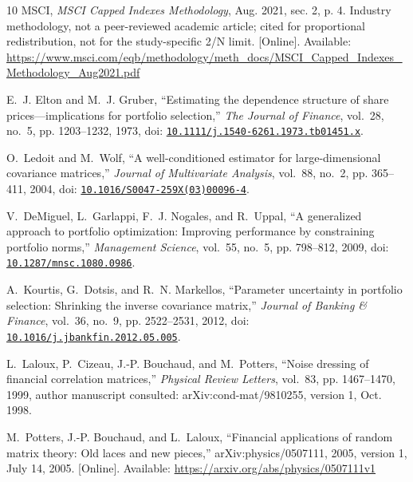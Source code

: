 \documentclass[letterpaper,journal]{IEEEtran}
\begin{document}
\begin{thebibliography}{10}
\BIBentryALTinterwordspacing
{MSCI}, \emph{{MSCI Capped Indexes Methodology}}, Aug. 2021, sec. 2, p. 4.
  Industry methodology, not a peer-reviewed academic article; cited for
  proportional redistribution, not for the study-specific 2/N limit. [Online].
  Available:
  \url{https://www.msci.com/eqb/methodology/meth_docs/MSCI_Capped_Indexes_Methodology_Aug2021.pdf}
\BIBentrySTDinterwordspacing

E.~J. Elton and M.~J. Gruber, ``Estimating the dependence structure of share
  prices---implications for portfolio selection,'' \emph{The Journal of
  Finance}, vol.~28, no.~5, pp. 1203--1232, 1973, doi:
  \href{https://doi.org/10.1111/j.1540-6261.1973.tb01451.x}{\nolinkurl{10.1111/j.1540-6261.1973.tb01451.x}}.

O.~Ledoit and M.~Wolf, ``A well-conditioned estimator for large-dimensional
  covariance matrices,'' \emph{Journal of Multivariate Analysis}, vol.~88,
  no.~2, pp. 365--411, 2004, doi:
  \href{https://doi.org/10.1016/S0047-259X(03)00096-4}{\nolinkurl{10.1016/S0047-259X(03)00096-4}}.

V.~DeMiguel, L.~Garlappi, F.~J. Nogales, and R.~Uppal, ``A generalized approach
  to portfolio optimization: Improving performance by constraining portfolio
  norms,'' \emph{Management Science}, vol.~55, no.~5, pp. 798--812, 2009, doi:
  \href{https://doi.org/10.1287/mnsc.1080.0986}{\nolinkurl{10.1287/mnsc.1080.0986}}.

A.~Kourtis, G.~Dotsis, and R.~N. Markellos, ``Parameter uncertainty in
  portfolio selection: Shrinking the inverse covariance matrix,'' \emph{Journal
  of Banking \& Finance}, vol.~36, no.~9, pp. 2522--2531, 2012, doi:
  \href{https://doi.org/10.1016/j.jbankfin.2012.05.005}{\nolinkurl{10.1016/j.jbankfin.2012.05.005}}.

L.~Laloux, P.~Cizeau, J.-P. Bouchaud, and M.~Potters, ``Noise dressing of
  financial correlation matrices,'' \emph{Physical Review Letters}, vol.~83,
  pp. 1467--1470, 1999, author manuscript consulted: arXiv:cond-mat/9810255,
  version 1, Oct. 1998.

\BIBentryALTinterwordspacing
M.~Potters, J.-P. Bouchaud, and L.~Laloux, ``Financial applications of random
  matrix theory: Old laces and new pieces,'' arXiv:physics/0507111, 2005,
  version 1, July 14, 2005. [Online]. Available:
  \url{https://arxiv.org/abs/physics/0507111v1}
\BIBentrySTDinterwordspacing


\end{thebibliography}
\end{document}
